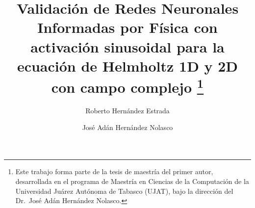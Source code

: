 \documentclass[runningheads]{llncs}
\begin{document}

\title{Validaci\'{o}n de Redes Neuronales Informadas por F\'{i}sica con
       activaci\'{o}n sinusoidal para la ecuaci\'{o}n de Helmholtz 1D y 2D
       con campo complejo%
       \thanks{Este trabajo forma parte de la tesis de maestr\'{i}a
               del primer autor, desarrollada en el programa de
               Maestr\'{i}a en Ciencias de la Computaci\'{o}n de la
               Universidad Ju\'{a}rez Aut\'{o}noma de Tabasco (UJAT),
               bajo la direcci\'{o}n del
               Dr.~Jos\'{e} Ad\'{a}n Hern\'{a}ndez Nolasco.}}


\author{Roberto Hern\'{a}ndez Estrada \and
        Jos\'{e} Ad\'{a}n Hern\'{a}ndez Nolasco}



\maketitle
\end{document}
